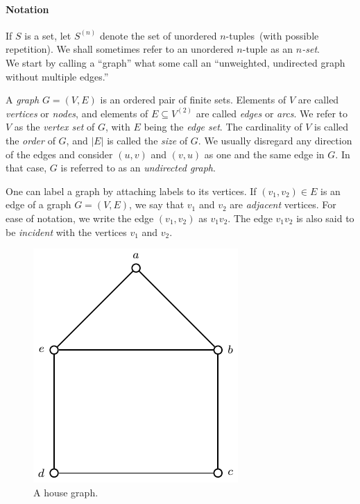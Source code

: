 \paragraph{Notation}
If $S$ is a set, let $S^{(n)}$ denote the set of unordered
$n$-tuples~(with possible repetition). We shall sometimes
refer to an unordered $n$-tuple as an
\emph{$n$-set}. \\

\noindent
We start by calling a ``graph'' what some call an
``unweighted,
undirected graph without
multiple edges.''

\begin{definition}
\rm
A \emph{graph} $G = (V, E)$ is an ordered pair of finite
sets. Elements of $V$ are called \emph{vertices} or
\emph{nodes}, and elements of $E \subseteq V^{(2)}$ are
called \emph{edges} or \emph{arcs}. We refer
to $V$ as the \emph{vertex set} of $G$, with $E$
being the \emph{edge set}. The cardinality of $V$ is
called the \emph{order} of $G$, and $|E|$ is called the
\emph{size} of $G$. We usually disregard any direction of
the edges and consider $(u,v)$ and $(v,u)$ as one and the same edge in
$G$. In that case, $G$ is referred to as an
\emph{undirected graph}.
\end{definition}

One can label a graph by attaching labels to its vertices.
If $(v_1, v_2) \in E$ is an edge of a graph $G = (V, E)$, we say that
$v_1$ and $v_2$ are \emph{adjacent}
vertices. For ease of notation, we write the edge $(v_1, v_2)$ as
$v_1 v_2$. The edge $v_1 v_2$ is also said to be
\emph{incident} with the vertices $v_1$ and
$v_2$.

\begin{figure}[!htbp]
\centering
{}
\includegraphics{image/introduction/house-graph}
\caption{A house graph.}
\label{fig:introduction:house_graph}
\end{figure}

